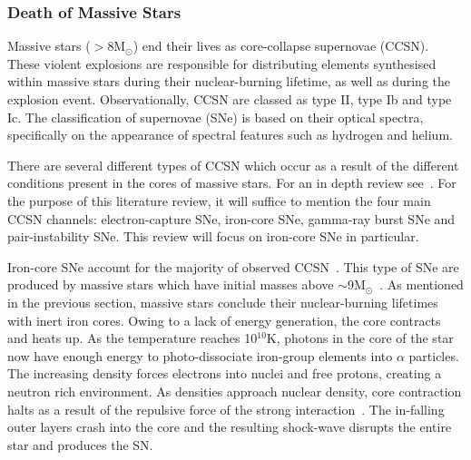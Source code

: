 \documentclass[a4paper,12pt]{article}
\begin{document}







\subsubsection{Death of Massive Stars}\label{fate}

Massive stars ($>$8M$_{\odot}$) end their lives as core-collapse supernovae (CCSN). 
These violent explosions are responsible for distributing elements synthesised within massive stars during their nuclear-burning lifetime, as well as during the explosion event.
Observationally, CCSN are classed as type II, type Ib and type Ic.\footnotemark 
{}
The classification of supernovae (SNe) is based on their optical spectra, specifically on the appearance of spectral features such as hydrogen and helium. 

There are several different types of CCSN which occur as a result of the different conditions present in the cores of massive stars. 
For an in depth review see~\cite{Janka12}.
For the purpose of this literature review, it will suffice to mention the four main CCSN channels: electron-capture SNe, iron-core SNe, gamma-ray burst SNe and pair-instability SNe.
This review will focus on iron-core SNe in particular.

Iron-core SNe account for the majority of observed CCSN~\citep{Smartt09,Janka12,Eldridge13}. 
This type of SNe are produced by massive stars which have initial masses above $\sim$9M$_{\odot}$~\citep{Poelarends08}.
As mentioned in the previous section, massive stars conclude their nuclear-burning lifetimes with inert iron cores. 
Owing to a lack of energy generation, the core contracts and heats up. 
As the temperature reaches 10$^{10}$K, photons in the core of the star now have enough energy to photo-dissociate iron-group elements into $\alpha$ particles. 
The increasing density forces electrons into nuclei and free protons, creating a neutron rich environment. 
As densities approach nuclear density, core contraction halts as a result of the repulsive force of the strong interaction~\citep{Janka12}.
The in-falling outer layers crash into the core and the resulting shock-wave disrupts the entire star and produces the SN. 
\end{document}
